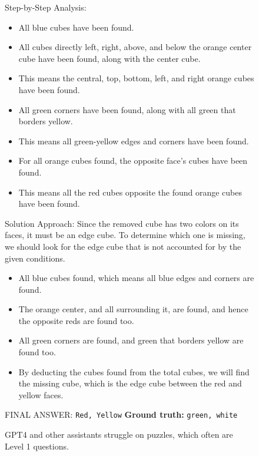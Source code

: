 \documentclass{fairmeta}
\begin{document}
\begin{figure}[h!]
\begin{tcolorbox}[colframe=RoyalBlue, colback=white]
Step-by-Step Analysis:
\begin{itemize}
    \item All blue cubes have been found.
    \item All cubes directly left, right, above, and below the orange center cube have been found, along with the center cube.
    \item This means the central, top, bottom, left, and right orange cubes have been found.
    \item All green corners have been found, along with all green that borders yellow.
    \item This means all green-yellow edges and corners have been found.
    \item For all orange cubes found, the opposite face’s cubes have been found.
    \item This means all the red cubes opposite the found orange cubes have been found.
\end{itemize}

Solution Approach:
Since the removed cube has two colors on its faces, it must be an edge cube. To determine which one is missing, we should look for the edge cube that is not accounted for by the given conditions.
\begin{itemize}
    \item All blue cubes found, which means all blue edges and corners are found.
    \item The orange center, and all surrounding it, are found, and hence the opposite reds are found too.
    \item All green corners are found, and green that borders yellow are found too.
    \item By deducting the cubes found from the total cubes, we will find the missing cube, which is the edge cube between the red and yellow faces.
\end{itemize}

FINAL ANSWER: \texttt{Red, Yellow} \hspace{.5cm}\textbf{Ground truth:} \texttt{green, white} \textcolor{red}{\Large {}}


    \end{tcolorbox}
    \caption{GPT4 and other assistants struggle on puzzles, which often are Level 1 questions.}
    \label{fig:demo_gpt4_rubikscube}
\end{figure}
\end{document}
